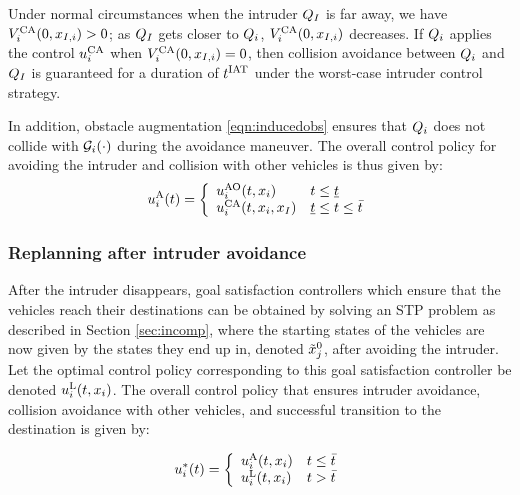 Under normal circumstances when the intruder $Q_{I}$ is far away, we have $V^{\text{CA}}_{i}(0, x_{I, i}) > 0$; as $Q_{I}$ gets closer to $Q_i$, $V^{\text{CA}}_{i}(0, x_{I, i})$ decreases. If $Q_i$ applies the control ${u^{\text{CA}}_{i}}$ when $V^{\text{CA}}_{i}(0, x_{I, i}) = 0$, then collision avoidance between $Q_i$ and $Q_{I}$ is guaranteed for a duration of $t^\text{IAT}$ under the worst-case intruder control strategy.

In addition, obstacle augmentation \eqref{eqn:inducedobs} ensures that $Q_i$ does not collide with $\mathcal{G}_i(\cdot)$ during the avoidance maneuver. %
The overall control policy for avoiding the intruder and collision with other vehicles is thus given by:
\begin{equation*}
{u^{\text{A}}_{i}}(t) = 
\left \{ 
\begin{array}{ll}
{u^{\text{AO}}_{i}}(t, x_i) & t \leq \underline{t}\\
{u^{\text{CA}}_{i}}(t, x_i, x_I) & \underline{t}\leq t \leq \bar{t}
\end{array}
\right.
\end{equation*}

\subsubsection{Replanning after intruder avoidance\label{sec:re-plan_method1}} 
After the intruder disappears, goal satisfaction controllers which ensure that the vehicles reach their destinations can be obtained by solving an STP problem as described in Section \ref{sec:incomp}, where the starting states of the vehicles are now given by the states they end up in, denoted $\tilde{x}_j^0$, after avoiding the intruder. Let the optimal control policy corresponding to this goal satisfaction controller be denoted ${u^{\text{L}}_{i}}(t, x_i)$. The overall control policy that ensures intruder avoidance, collision avoidance with other vehicles, and successful transition to the destination is given by:

\begin{equation*}
u_i^*(t) = 
\left \{ 
\begin{array}{ll}
{u^{\text{A}}_{i}}(t, x_i) & t \leq \bar{t}\\
{u^{\text{L}}_{i}}(t, x_i) & t > \bar{t}
\end{array}
\right.
\end{equation*}

